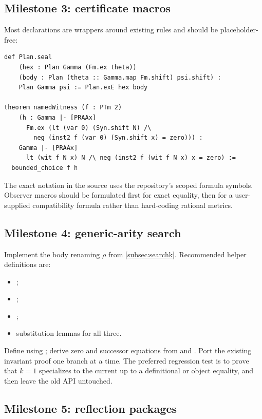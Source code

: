 \subsection{Milestone 3: certificate macros}

Most declarations are wrappers around existing rules and should be placeholder-free:

\begin{lstlisting}[language=Lean]
def Plan.seal
    (hex : Plan Gamma (Fm.ex theta))
    (body : Plan (theta :: Gamma.map Fm.shift) psi.shift) :
    Plan Gamma psi := Plan.exE hex body

theorem namedWitness (f : PTm 2)
    (h : Gamma |- [PRAAx]
      Fm.ex (lt (var 0) (Syn.shift N) /\
        neg (inst2 f (var 0) (Syn.shift x) = zero))) :
    Gamma |- [PRAAx]
      lt (wit f N x) N /\ neg (inst2 f (wit f N x) x = zero) :=
  bounded_choice f h
\end{lstlisting}

The exact notation in the source uses the repository's scoped formula symbols.  Observer macros
should be formulated first for exact equality, then for a user-supplied compatibility formula rather
than hard-coding rational metrics.

\subsection{Milestone 4: generic-arity search}

Implement the body renaming \(\rho\) from \cref{subsec:searchk}.  Recommended helper definitions are:

\begin{itemize}
\item {};
\item {};
\item {};
\item substitution lemmas for all three.
\end{itemize}

Define  using ; derive zero and successor equations from
\code{rec_zero} and \code{rec_succ}.  Port the existing invariant proof one branch at a time.  The
preferred regression test is to prove that \(k=1\) specializes to the current \code{Search.mu}
up to a definitional or object equality, and then leave the old API untouched.

\subsection{Milestone 5: reflection packages}

